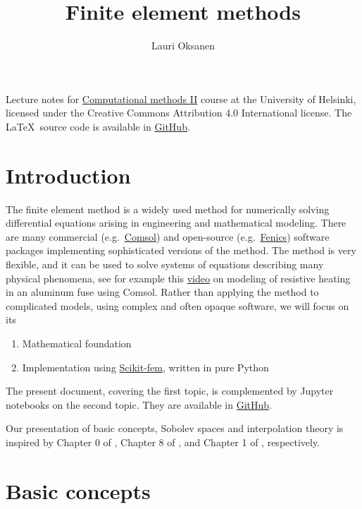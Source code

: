 \documentclass[12pt,oneside,final]{amsart}
\title{Finite element methods}
\author{Lauri Oksanen}
\begin{document}
\maketitle

\noindent
Lecture notes for
\href{https://studies.helsinki.fi/courses/cu/hy-CU-141575726-2020-08-01}{Computational methods II} course at the University of Helsinki, licensed under the Creative Commons Attribution 4.0 International license.
The \LaTeX\ source code is available in \href{https://github.com/uh-comp-methods2/lectures}{GitHub}.

\tableofcontents

\section{Introduction}

The finite element method is a widely used method for numerically solving differential equations arising in engineering and mathematical modeling. There are many commercial (e.g.~\href{https://en.wikipedia.org/wiki/COMSOL_Multiphysics}{Comsol}) and open-source (e.g.~\href{https://en.wikipedia.org/wiki/FEniCS_Project}{Fenics}) software packages implementing sophisticated versions of the method. The method is very flexible, and it can be used to solve systems of equations describing many physical phenomena, see for example this \href{https://www.comsol.com/video/joule-heating-fuse-circuit-board-chapter-1}{video} on modeling of resistive heating in an aluminum fuse using Comsol. Rather than applying the method to complicated models, using complex and often opaque software, we will focus on its

\begin{enumerate}[1. ]
\item Mathematical foundation
\item Implementation using \href{https://scikit-fem.readthedocs.io/en/latest/}{Scikit-fem}, written in pure Python 
\end{enumerate}

The present document, covering the first topic, is complemented by Jupyter notebooks on the second topic. They are available in 
\href{https://github.com/uh-comp-methods2/notebooks}{GitHub}.

Our presentation of basic concepts, Sobolev spaces and interpolation theory is inspired by Chapter 0 of \cite{BS}, Chapter 8 of \cite{Brezis}, and Chapter 1 of \cite{EG}, respectively. 

\section{Basic concepts}
\end{document}
